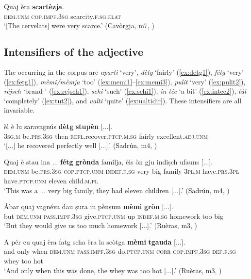 \ea
\label{ex:scartezja1}
\gll Quaj èra \textbf{scartèzja}.   \\
\textsc{dem.unm} \textsc{cop.impf.3sg} scarcity.\textsc{f.sg.elat}\\
\glt `[The cervelats] were very scarce.' (Cavòrgja, m7, )
\z

\subsection{Intensifiers of the adjective}\label{sec:3.3.3}
The  occurring in the corpus are \textit{aparti} `very', \textit{dètg} `fairly' (\ref{ex:detg1}), \textit{fétg} `very' (\ref{ex:fetg1}), \textit{mèmi/mèmja} `too' (\ref{ex:memi1}--\ref{ex:memi3}), \textit{pulit} `very' (\ref{ex:pulit2}), \textit{réjsch} `brand-' (\ref{ex:rejsch1}), \textit{schi} `such' (\ref{ex:schi1}), \textit{in téc} `a bit' (\ref{ex:intec2}), \textit{tùt} `completely' (\ref{ex:tut2}), and \textit{ualti} `quite' (\ref{ex:ualtidir}). These intensifiers are all invariable.

\ea
\label{ex:detg1}
\gll [...] èl è lu saravagnús \textbf{dètg} \textbf{stupèn} [...].   \\
{} \textsc{3sg.m} be.\textsc{prs.3sg} then \textsc{refl}.recover.\textsc{ptcp.m.sg} fairly  excellent.\textsc{adj.unm}\\
\glt `[...] he recovered perfectly well [...].' (Sadrún, m4, )
\z

\ea
\label{ex:fetg1}
\gll Quaj è stau ina ... \textbf{fétg} \textbf{grònda} familja, èls òn gju indiṣch ufauns [...].   \\
\textsc{dem.unm}  be.\textsc{prs.3sg}  \textsc{cop.ptcp.unm} \textsc{indef.f.sg} {} very big family \textsc{3pl.m} have.\textsc{prs.3pl} have.\textsc{ptcp.unm} eleven child.\textsc{m.pl}\\
\glt `This was a ... very big family, they had eleven children [...].' (Sadrún, m4, )
\z

\ea
\label{ex:memi1}
\gll  Ábar quaj vagnéva dau ṣura in pènṣum \textbf{mèmi} \textbf{gròn} [...].  \\
but \textsc{dem.unm} \textsc{pass.impf.3sg} give.\textsc{ptcp.unm} up \textsc{indef.m.sg} homework too big\\
\glt `But they would give us too much homework [...].' (Ruèras, m3, )
\z

\ea
\label{ex:memi2}
\gll  A pér cu quaj èra fatg scha èra la scòtga \textbf{mèmi} \textbf{tgauda} [...].  \\
and only when \textsc{dem.unm} \textsc{pass.impf.3sg} do.\textsc{ptcp.unm} \textsc{corr} \textsc{cop.impf.3sg} \textsc{def.f.sg} whey too hot\\
\glt `And only when this was done, the whey was too hot [...].' (Ruèras, m3, )
\z

